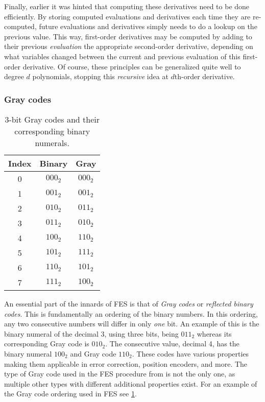 Finally, earlier it was hinted that computing these derivatives need to be done efficiently. By storing computed evaluations and derivatives each time they are re-computed, future evaluations and derivatives simply needs to do a lookup on the previous value. This way, first-order derivatives may be computed by adding to their previous \textit{evaluation} the appropriate second-order derivative, depending on what variables changed between the current and previous evaluation of this first-order derivative. Of course, these principles can be generalized quite well to degree $d$ polynomials, stopping this \textit{recursive} idea at $d$th-order derivative.

\subsubsection{Gray codes} \label{sec:prereq:fes:gray_codes}

\begin{table}[t]
    \begin{center}
        \begin{tabular}{||c|c|c||}
            \hline
            Index & Binary & Gray \\
            \hline
            0 & $000_2$ & $000_2$\\
            1 & $001_2$ & $001_2$\\
            2 & $010_2$ & $011_2$\\
            3 & $011_2$ & $010_2$\\
            4 & $100_2$ & $110_2$\\
            5 & $101_2$ & $111_2$\\
            6 & $110_2$ & $101_2$\\
            7 & $111_2$ & $100_2$\\
            \hline
        \end{tabular}
    \end{center}
    \caption{3-bit Gray codes and their corresponding binary numerals.} \label{tbl:gray}
\end{table}

An essential part of the innards of FES is that of \textit{Gray codes} or \textit{reflected binary codes}. This is fundamentally an ordering of the binary numbers. In this ordering, any two consecutive numbers will differ in only \textit{one} bit. An example of this is the binary numeral of the decimal 3, using three bits, being $011_2$ whereas its corresponding Gray code is $010_2$.
The consecutive value, decimal 4, has the binary numeral $100_2$ and Gray code $110_2$. These codes have various properties making them applicable in error correction, position encoders, and more. The type of Gray code used in the FES procedure from \cite{ches-2010-23990, cryptoeprint:2013/436,tungchoumasters} is not the only one, as multiple other types with different additional properties exist. For an example of the Gray code ordering used in FES see \cref{tbl:gray}.

